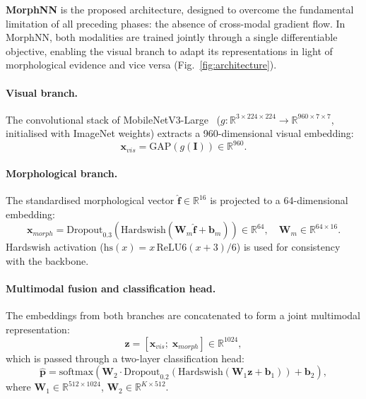 \documentclass[preprint,12pt]{elsarticle}
\begin{document}
\textbf{MorphNN} is the proposed architecture, designed to overcome the
fundamental limitation of all preceding phases: the absence of
cross-modal gradient flow.  In MorphNN, both modalities are trained
jointly through a single differentiable objective, enabling the visual
branch to adapt its representations in light of morphological evidence
and vice versa (Fig.~\ref{fig:architecture}).

\paragraph{Visual branch.}
The convolutional stack of MobileNetV3-Large~\cite{howard2019mobilenetv3}
($g : \mathbb{R}^{3\times 224 \times 224} \to \mathbb{R}^{960\times7\times7}$,
initialised with ImageNet weights) extracts a 960-dimensional visual embedding:
\begin{equation}
  \mathbf{x}_{vis} = \mathrm{GAP}\!\left(g(\mathbf{I})\right) \in \mathbb{R}^{960}.
  \label{eq:morphnn_visual}
\end{equation}

\paragraph{Morphological branch.}
The standardised morphological vector $\hat{\mathbf{f}} \in \mathbb{R}^{16}$
is projected to a 64-dimensional embedding:
\begin{equation}
  \mathbf{x}_{morph} =
  \mathrm{Dropout}_{0.3}\!\left(\mathrm{Hardswish}\!\left(
    \mathbf{W}_m\hat{\mathbf{f}} + \mathbf{b}_m\right)\right)
  \in \mathbb{R}^{64},\quad
  \mathbf{W}_m \in \mathbb{R}^{64\times16}.
  \label{eq:morphnn_morph}
\end{equation}
Hardswish activation ($\mathrm{hs}(x) = x\,\mathrm{ReLU6}(x+3)/6$)
is used for consistency with the backbone.

\paragraph{Multimodal fusion and classification head.}
The embeddings from both branches are concatenated to form a joint
multimodal representation:
\begin{equation}
  \mathbf{z} = [\mathbf{x}_{vis};\;\mathbf{x}_{morph}] \in \mathbb{R}^{1024},
  \label{eq:morphnn_fusion}
\end{equation}
which is passed through a two-layer classification head:
\begin{equation}
  \hat{\mathbf{p}} = \mathrm{softmax}\!\left(
    \mathbf{W}_2\cdot\mathrm{Dropout}_{0.2}\!\left(
      \mathrm{Hardswish}\!\left(\mathbf{W}_1\mathbf{z} + \mathbf{b}_1\right)
    \right) + \mathbf{b}_2
  \right),
  \label{eq:morphnn_head}
\end{equation}
where $\mathbf{W}_1 \in \mathbb{R}^{512\times1024}$,
$\mathbf{W}_2 \in \mathbb{R}^{K\times512}$.
\end{document}
